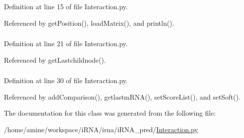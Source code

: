 \-Definition at line 15 of file \-Interaction.\-py.



\-Referenced by get\-Position(), load\-Matrix(), and println().

\hypertarget{classirna_1_1iRNA__pred_1_1Interaction_1_1Interaction_a308dbd425c938a70e8be3acae4cf4f56}{
\subsubsection[{root}]{}}
\label{classirna_1_1iRNA__pred_1_1Interaction_1_1Interaction_a308dbd425c938a70e8be3acae4cf4f56}


\-Definition at line 21 of file \-Interaction.\-py.



\-Referenced by get\-Lastchildnode().

\hypertarget{classirna_1_1iRNA__pred_1_1Interaction_1_1Interaction_aff10b76c7d1f1fcc1b0e9a07e841121c}{
\subsubsection[{schema\-\_\-root}]{}}
\label{classirna_1_1iRNA__pred_1_1Interaction_1_1Interaction_aff10b76c7d1f1fcc1b0e9a07e841121c}


\-Definition at line 30 of file \-Interaction.\-py.



\-Referenced by add\-Comparison(), getlastm\-R\-N\-A(), set\-Score\-List(), and set\-Soft().



\-The documentation for this class was generated from the following file\-:\begin{DoxyCompactItemize}
\item 
/home/amine/workspace/i\-R\-N\-A/irna/i\-R\-N\-A\-\_\-pred/\hyperlink{iRNA__pred_2Interaction_8py}{\-Interaction.\-py}\end{DoxyCompactItemize}

